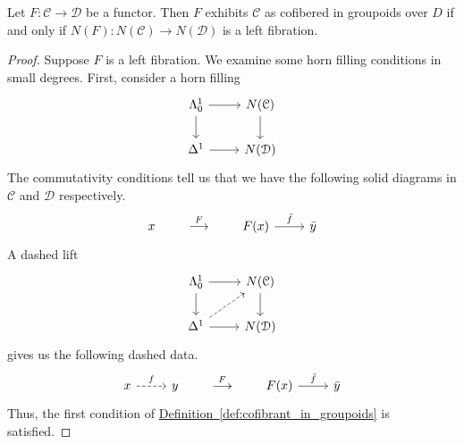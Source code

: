 \documentclass[main.tex]{subfiles}
\begin{document}
\begin{theorem}
  Let $F\colon \mathcal{C} \to \mathcal{D}$ be a functor. Then $F$ exhibits $\mathcal{C}$ as cofibered in groupoids over $D$ if and only if $N(F)\colon N(\mathcal{C}) \to N(\mathcal{D})$ is a left fibration.
\end{theorem}
\begin{proof}
  Suppose $F$ is a left fibration. We examine some horn filling conditions in small degrees.
  First, consider a horn filling
  \begin{equation*}
    \begin{tikzcd}
      \Lambda^{1}_{0}
      \arrow[r]
      \arrow[d, swap,]
      & N(\mathcal{C})
      \arrow[d]
      \\
      \Delta^{1}
      \arrow[r, swap]
      & N(\mathcal{D})
    \end{tikzcd}
  \end{equation*}
  The commutativity conditions tell us that we have the following solid diagrams in $\mathcal{C}$ and $\mathcal{D}$ respectively.
  \begin{equation*}
    \begin{tikzcd}
      x
    \end{tikzcd}
    \qquad \overset{F}{\longrightarrow}\qquad
    \begin{tikzcd}
      F(x)
      \arrow[r, "\bar{f}"]
      & \bar{y}
    \end{tikzcd}
  \end{equation*}
  A dashed lift
  \begin{equation*}
    \begin{tikzcd}
      \Lambda^{1}_{0}
      \arrow[r]
      \arrow[d, swap,]
      & N(\mathcal{C})
      \arrow[d]
      \\
      \Delta^{1}
      \arrow[r, swap]
      \arrow[ur, dashed]
      & N(\mathcal{D})
    \end{tikzcd}
  \end{equation*}
  gives us the following dashed data.
  \begin{equation*}
    \begin{tikzcd}
      x
      \arrow[r, dashed, "f"]
      & y
    \end{tikzcd}
    \qquad \overset{F}{\longrightarrow}\qquad
    \begin{tikzcd}
      F(x)
      \arrow[r, "\bar{f}"]
      & \bar{y}
    \end{tikzcd}
  \end{equation*}
  Thus, the first condition of \hyperref[def:cofibrant_in_groupoids]{Definition~\ref*{def:cofibrant_in_groupoids}} is satisfied.


\end{proof}
\end{document}
